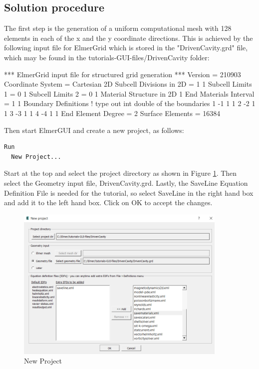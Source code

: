 \subsection*{Solution procedure}

The first step is the generation of a uniform computational mesh with 128 elements in each of the x and the y coordinate directions. This is achieved by the following input file for ElmerGrid which is stored in the "DrivenCavity.grd" file, which may be found in the tutorials-GUI-files/DrivenCavity folder:

\ttbegin
*** ElmerGrid input file for structured grid generation ***
Version = 210903
Coordinate System = Cartesian 2D
Subcell Divisions in 2D = 1 1
Subcell Limits 1 = 0 1
Subcell Limits 2 = 0 1
Material Structure in 2D
  1
End
Materials Interval = 1 1
Boundary Definitions
! type out int double of the boundaries
  1     -1   1   1
  2     -2   1   1
  3     -3   1   1
  4     -4   1   1
End
Element Degree = 2
Surface Elements = 16384
\ttend

Then start ElmerGUI and create a new project, as follows:

\begin{verbatim}
Run
  New Project...
\end{verbatim}

Start at the top and select the project directory as shown in Figure \ref{fg:new_project}.  Then select the Geometry input file, DrivenCavity.grd.  Lastly, the SaveLine Equation Definition File is needed for the tutorial, so select SaveLine in the right hand box and add it to the left hand box.  Click on OK to accept the changes.

\begin{figure}[H]
\centering
\includegraphics[width=0.9\textwidth]{new_project.png}
\caption{New Project}\label{fg:new_project}
\end{figure}  

